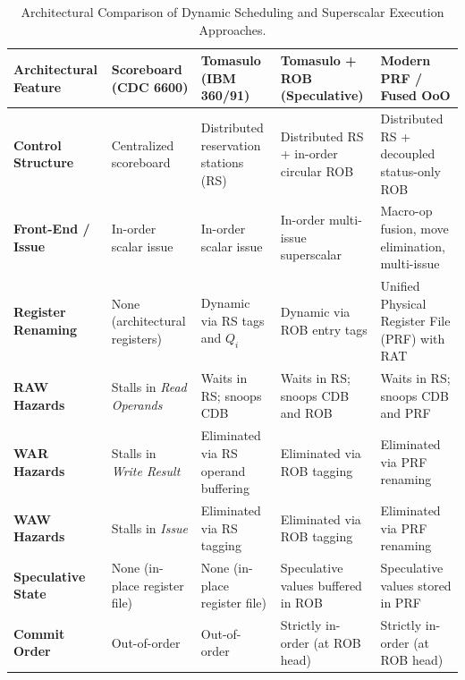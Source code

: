 \begin{table}[htbp]
  \begin{center}
    \caption{Architectural Comparison of Dynamic Scheduling and Superscalar Execution Approaches.}
    \label{tab:scoreboard_vs_tomasulo}
    \vspace{0.5em}
    {\footnotesize
    \setlength{\tabcolsep}{3.5pt}
    \renewcommand{\arraystretch}{1.15}
    \begin{tabularx}{\textwidth}{|>{\raggedright\arraybackslash\bfseries}p{2.2cm}|>{\raggedright\arraybackslash}X|>{\raggedright\arraybackslash}X|>{\raggedright\arraybackslash}X|>{\raggedright\arraybackslash}X|}
      \hline
      \textbf{Architectural Feature} & \textbf{Scoreboard (CDC 6600)} & \textbf{Tomasulo (IBM 360/91)} & \textbf{Tomasulo + ROB (Speculative)} & \textbf{Modern PRF / Fused OoO} \\ 
      \hline \hline
      \textbf{Control Structure}    & Centralized scoreboard         & Distributed reservation stations (RS) & Distributed RS + in-order circular ROB & Distributed RS + decoupled status-only ROB \\ \hline
      \textbf{Front-End / Issue}    & In-order scalar issue          & In-order scalar issue          & In-order multi-issue superscalar      & Macro-op fusion, move elimination, multi-issue \\ \hline
      \textbf{Register Renaming}    & None (architectural registers) & Dynamic via RS tags and $Q_i$   & Dynamic via ROB entry tags             & Unified Physical Register File (PRF) with RAT \\ \hline
      \textbf{RAW Hazards}          & Stalls in \textit{Read Operands} & Waits in RS; snoops CDB       & Waits in RS; snoops CDB and ROB        & Waits in RS; snoops CDB and PRF \\ \hline
      \textbf{WAR Hazards}          & Stalls in \textit{Write Result} & Eliminated via RS operand buffering & Eliminated via ROB tagging             & Eliminated via PRF renaming \\ \hline
      \textbf{WAW Hazards}          & Stalls in \textit{Issue}       & Eliminated via RS tagging      & Eliminated via ROB tagging             & Eliminated via PRF renaming \\ \hline
      \textbf{Speculative State}    & None (in-place register file)  & None (in-place register file)  & Speculative values buffered in ROB     & Speculative values stored in PRF \\ \hline
      \textbf{Commit Order}         & Out-of-order                   & Out-of-order                   & Strictly in-order (at ROB head)        & Strictly in-order (at ROB head) \\ \hline

\end{tabularx}}
\end{center}
\end{table}
